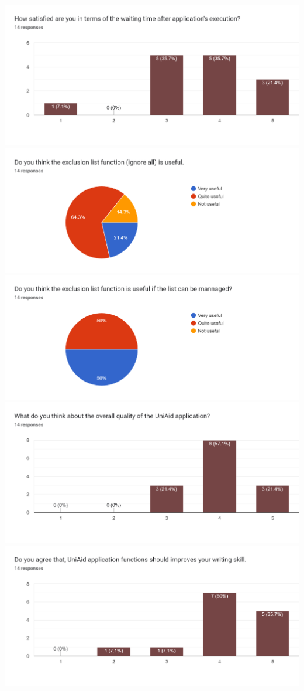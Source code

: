 \documentclass[12pt,oneside,openright,a4paper]{cpe-english-project}
\begin{document}
\includegraphics[width=15cm]{./img/chp4/q-use5.png}
\includegraphics[width=15cm]{./img/chp4/q-use6.png}
\includegraphics[width=15cm]{./img/chp4/q-use7.png}
\includegraphics[width=15cm]{./img/chp4/q-use8.png}
\includegraphics[width=15cm]{./img/chp4/q-use9.png}
\end{document}
